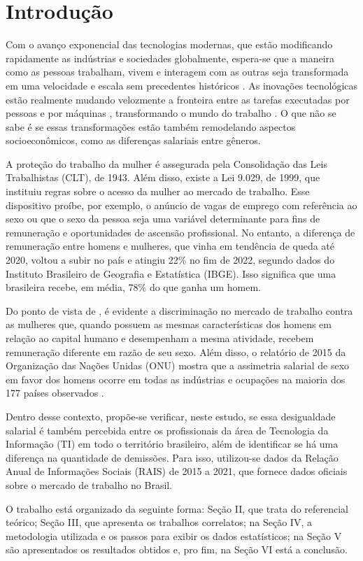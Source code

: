 \section{Introdução}

Com o avanço exponencial das tecnologias modernas, que estão modificando rapidamente as indústrias e sociedades globalmente, espera-se que a maneira como as pessoas trabalham, vivem e interagem com as outras seja transformada em uma velocidade e escala sem precedentes históricos \cite{hand1981artificial}. As inovações tecnológicas estão realmente mudando velozmente a fronteira entre as tarefas executadas por pessoas e por máquinas , transformando o mundo do trabalho \cite{aksoy2021robots}. O que não se sabe é se essas transformações estão também remodelando aspectos socioeconômicos, como as diferenças salariais entre gêneros.

A proteção do trabalho da mulher é assegurada pela Consolidação das Leis Trabalhistas (CLT), de 1943. Além disso, existe a Lei 9.029, de 1999, que instituiu regras sobre o acesso da mulher ao mercado de trabalho. Esse dispositivo proíbe, por exemplo, o anúncio de vagas de emprego com referência ao sexo ou que o sexo da pessoa seja uma variável determinante para fins de remuneração e oportunidades de ascensão profissional. No entanto, a diferença de remuneração entre homens e mulheres, que vinha em tendência de queda até 2020, voltou a subir no país e atingiu 22\% no fim de 2022, segundo dados do Instituto Brasileiro de Geografia e Estatística (IBGE). Isso significa que uma brasileira recebe, em média, 78\% do que ganha um homem.

Do ponto de vista de \cite{ahmed2015human}, é evidente a discriminação no mercado de trabalho contra as mulheres que, quando possuem as mesmas características dos homens em relação ao capital humano e desempenham a mesma atividade, recebem remuneração diferente em razão de seu sexo. Além disso, o relatório de 2015 da Organização das Nações Unidas (ONU) mostra que a assimetria salarial de sexo em favor dos homens ocorre em todas as indústrias e ocupações na maioria dos 177 países observados \cite{report2015onu}.

Dentro desse contexto, propõe-se verificar, neste estudo, se essa desigualdade salarial é também percebida entre os profissionais da área de Tecnologia da Informação (TI) em todo o território brasileiro, além de identificar se há uma diferença na quantidade de demissões. Para isso, utilizou-se dados da Relação Anual de Informações Sociais (RAIS) de 2015 a 2021, que fornece dados oficiais sobre o mercado de trabalho no Brasil. 

O trabalho está organizado da seguinte forma: Seção II, que trata do referencial teórico; Seção III, que apresenta os trabalhos correlatos; na Seção IV, a metodologia utilizada e os passos para exibir os dados estatísticos; na Seção V são apresentados os resultados obtidos e, pro fim, na Seção VI está a conclusão.